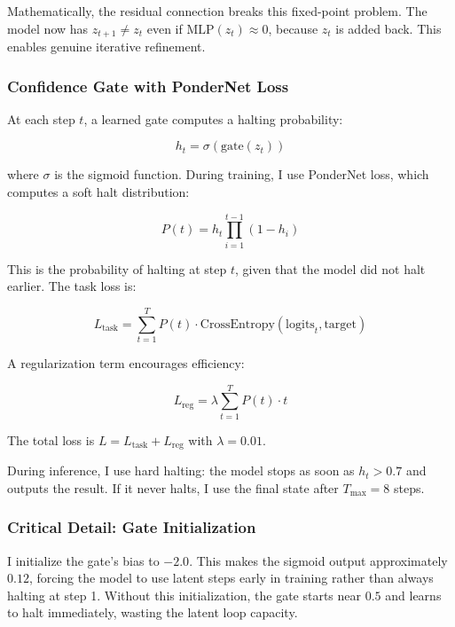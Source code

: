 \documentclass[11pt]{article}
\begin{document}
Mathematically, the residual connection breaks this fixed-point problem. The model now has $z_{t+1} \neq z_t$ even if $\text{MLP}(z_t) \approx 0$, because $z_t$ is added back. This enables genuine iterative refinement.

\subsubsection{Confidence Gate with PonderNet Loss}

At each step $t$, a learned gate computes a halting probability:

\begin{equation}
\label{eq:gate}
h_t = \sigma(\text{gate}(z_t))
\end{equation}

where $\sigma$ is the sigmoid function. During training, I use PonderNet loss\cite{Banino2021}, which computes a soft halt distribution:

\begin{equation}
\label{eq:ponder_dist}
P(t) = h_t \prod_{i=1}^{t-1} (1 - h_i)
\end{equation}

This is the probability of halting at step $t$, given that the model did not halt earlier. The task loss is:

\begin{equation}
\label{eq:task_loss}
L_{\text{task}} = \sum_{t=1}^{T} P(t) \cdot \text{CrossEntropy}(\text{logits}_t, \text{target})
\end{equation}

A regularization term encourages efficiency:

\begin{equation}
\label{eq:reg_loss}
L_{\text{reg}} = \lambda \sum_{t=1}^{T} P(t) \cdot t
\end{equation}

The total loss is $L = L_{\text{task}} + L_{\text{reg}}$ with $\lambda = 0.01$.

During inference, I use hard halting: the model stops as soon as $h_t > 0.7$ and outputs the result. If it never halts, I use the final state after $T_{\max} = 8$ steps.

\subsubsection{Critical Detail: Gate Initialization}

I initialize the gate's bias to $-2.0$. This makes the sigmoid output approximately $0.12$, forcing the model to use latent steps early in training rather than always halting at step 1. Without this initialization, the gate starts near $0.5$ and learns to halt immediately, wasting the latent loop capacity.
\end{document}
